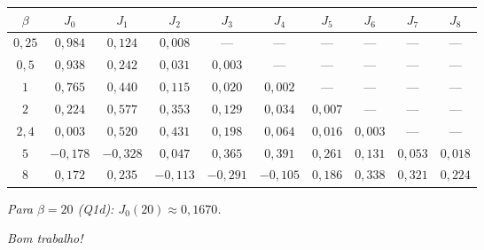 \documentclass[11pt,a4paper]{article}
\begin{document}
\vfill

\begin{instrucao}
\centering\small
\begin{tabular}{c|ccccccccc}
\toprule
$\beta$ & $J_0$ & $J_1$ & $J_2$ & $J_3$ & $J_4$ & $J_5$ & $J_6$ & $J_7$ & $J_8$ \\
\midrule
$0{,}25$ & $0{,}984$ & $0{,}124$ & $0{,}008$ & --- & --- & --- & --- & --- & --- \\
$0{,}5$  & $0{,}938$ & $0{,}242$ & $0{,}031$ & $0{,}003$ & --- & --- & --- & --- & --- \\
$1$      & $0{,}765$ & $0{,}440$ & $0{,}115$ & $0{,}020$ & $0{,}002$ & --- & --- & --- & --- \\
$2$      & $0{,}224$ & $0{,}577$ & $0{,}353$ & $0{,}129$ & $0{,}034$ & $0{,}007$ & --- & --- & --- \\
$2{,}4$  & $0{,}003$ & $0{,}520$ & $0{,}431$ & $0{,}198$ & $0{,}064$ & $0{,}016$ & $0{,}003$ & --- & --- \\
$5$      & $-0{,}178$ & $-0{,}328$ & $0{,}047$ & $0{,}365$ & $0{,}391$ & $0{,}261$ & $0{,}131$ & $0{,}053$ & $0{,}018$ \\
$8$      & $0{,}172$ & $0{,}235$ & $-0{,}113$ & $-0{,}291$ & $-0{,}105$ & $0{,}186$ & $0{,}338$ & $0{,}321$ & $0{,}224$ \\
\bottomrule
\end{tabular}

\vspace{0.2cm}\small\textit{Para $\beta = 20$ (Q1d): $J_0(20) \approx 0{,}1670$.}
\end{instrucao}

\vfill
\begin{center}
  \small\textit{Bom trabalho!}
\end{center}
\end{document}
